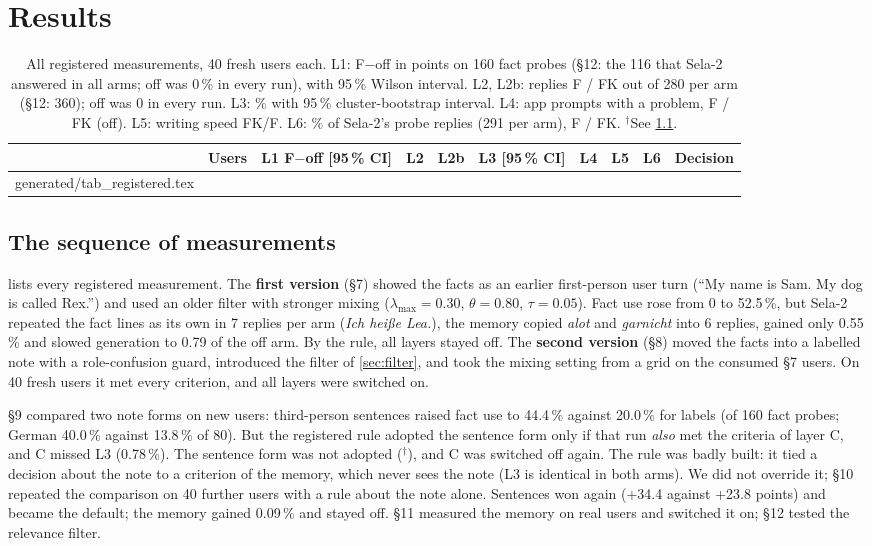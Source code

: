 \documentclass[10pt,twocolumn]{article}
\makeatletter
\newcommand*{\tablebody}[1]{\@@input generated/#1.tex }
\newcommand{\pct}{\,\%}
\makeatother
\begin{document}
\section{Results}\label{sec:results}

\begin{table}[t]
\centering
\footnotesize
\setlength{\tabcolsep}{4pt}
\caption{All registered measurements, 40 fresh users each. L1: F$-$off in points on 160 fact probes (\S12: the 116 that
Sela-2 answered in all arms; off was 0\pct{} in every run), with 95\pct{} Wilson interval. L2, L2b: replies F / FK out of 280 per arm (\S12: 360); off was 0 in every run. L3: \% with 95\pct{}
cluster-bootstrap interval. L4: app prompts with a problem, F / FK (off). L5: writing speed FK/F. L6: \% of Sela-2's probe
replies (291 per arm), F / FK. $^{\dagger}$See \cref{sec:overview}.}
\label{tab:registered}
\begin{tabular}{@{}llllllllll@{}}
\toprule
& Users & L1 F$-$off [95\pct{} CI] & L2 & L2b & L3 [95\pct{} CI] & L4 & L5 & L6 & Decision \\
\midrule
\tablebody{tab_registered}
\bottomrule
\end{tabular}
\end{table}

\subsection{The sequence of measurements}\label{sec:overview}

 lists every registered measurement. The \textbf{first version} (\S7) showed the facts as an earlier
first-person user turn (``My name is Sam. My dog is called Rex.'') and used an older filter with stronger mixing
($\lambda_{\max}{=}0.30$, $\theta{=}0.80$, $\tau{=}0.05$). Fact use rose from 0 to 52.5\pct, but Sela-2 repeated the fact
lines as its own in 7 replies per arm (\emph{Ich hei\ss{}e Lea.}), the memory copied \emph{alot} and \emph{garnicht} into 6
replies, gained only 0.55\pct{} and slowed generation to 0.79 of the off arm. By the rule, all layers stayed off. The
\textbf{second version} (\S8) moved the facts into a labelled note with a role-confusion guard, introduced the filter of
\cref{sec:filter}, and took the mixing setting from a grid on the consumed \S7 users. On 40 fresh users it met every
criterion, and all layers were switched on.

\S9 compared two note forms on new users: third-person sentences raised fact use to 44.4\pct{} against 20.0\pct{} for
labels (of 160 fact probes; German 40.0\pct{} against 13.8\pct{} of 80). But the registered rule adopted the sentence form only if that run
\emph{also} met the criteria of layer C, and C missed L3 (0.78\pct). The sentence form was not adopted ($^{\dagger}$), and
C was switched off again. The rule was badly built: it tied a decision about the note to a criterion of the memory,
which never sees the note (L3 is identical in both arms). We did not override it; \S10 repeated the comparison on 40
further users with a rule about the note alone. Sentences won again (+34.4 against +23.8 points) and became the default;
the memory gained 0.09\pct{} and stayed off. \S11 measured the memory on real users and switched it on; \S12 tested the
relevance filter.
\end{document}
